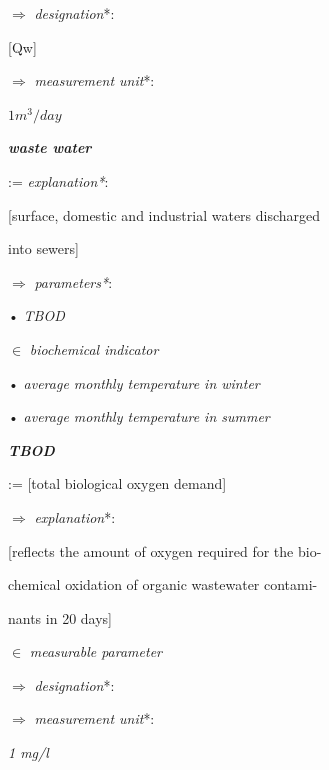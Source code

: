 \documentclass[10pt,final]{article}
\begin{document}
\begin{multicols}{2}
\hspace{0.24cm} \(\Rightarrow\)
\textit{designation}*:

\hspace{0.85cm}[Qw]

\hspace{0.35cm}\(\Rightarrow\)
\textit{measurement unit}*:

\hspace{0.85cm}\textit{$1m^3/day$}

\textbf{\textbraceright}

\noindent\textbf{\textit{waste water}}

\noindent := \textit{explanation*}: 

[surface, domestic and industrial waters discharged

into sewers] 

\noindent \(\Rightarrow\) 
\textit{parameters*}: 

\hspace{-0.25cm} \textbf{\textbraceleft}
• \textit{TBOD} 

\hspace{0.4cm} $\in$ 
\textit{biochemical indicator}

\hspace{0.2cm}•\textit{ average monthly temperature in winter}

\hspace{0.2cm}•\textit{ average monthly temperature in summer}

\hspace{-0.25cm} \textbf{\textbraceright}

\vspace{0.45cm}
\textbf{\textit{TBOD}}

\noindent := [total biological oxygen demand]

\noindent \(\Rightarrow\)
\textit{explanation}*:

[reflects the amount of oxygen required for the bio-

chemical oxidation of organic wastewater contami-

nants in 20 days]

\noindent $\in$ \textit{measurable parameter}


\newpage



\(\Rightarrow\) \textit{designation}*:

\noindent[L]

\(\Rightarrow\)
\textit{measurement unit}*:

\textit{1 mg/l}


\end{multicols}
\end{document}
